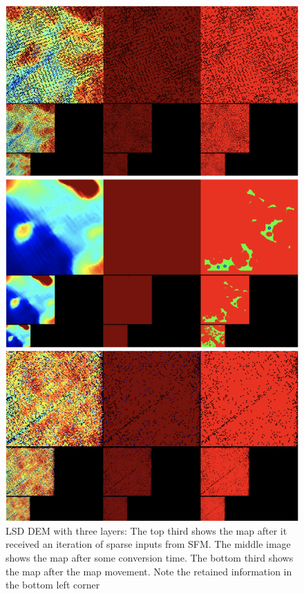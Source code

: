 \begin{figure}[h]
\centering
\includegraphics[scale=0.6]{images/appendix/layers/3.png}
\caption{LSD DEM with three layers: The top third shows the map after it received an iteration of sparse inputs from SFM. The middle image shows the map after some conversion time. The bottom third shows the map after the map movement. Note the retained information in the bottom left corner}
\label{fig:3_layers}
\end{figure}

